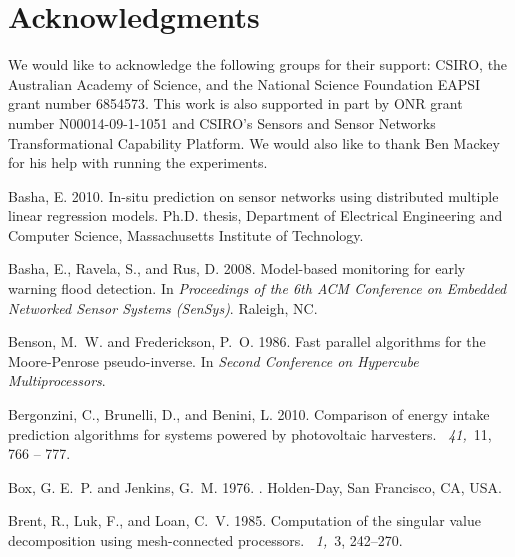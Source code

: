 \documentclass[prodmode,acmtosn]{acmsmall}
\begin{document}
\section{Acknowledgments}
We would like to acknowledge the following groups for their support: CSIRO, the Australian Academy of Science, and the National Science Foundation EAPSI grant number 6854573.
This work is also supported in part by ONR grant number N00014-09-1-1051 and CSIRO's Sensors and Sensor Networks Transformational Capability Platform.
We would also like to thank Ben Mackey for his help with running the experiments.

\begin{thebibliography}{}

{\sc Basha, E.} 2010.
\newblock In-situ prediction on sensor networks using distributed multiple
  linear regression models.
\newblock Ph.D. thesis, Department of Electrical Engineering and Computer
  Science, Massachusetts Institute of Technology.

{\sc Basha, E.}, {\sc Ravela, S.}, {\sc and} {\sc Rus, D.} 2008.
\newblock Model-based monitoring for early warning flood detection.
\newblock In {\em Proceedings of the 6th ACM Conference on Embedded Networked
  Sensor Systems (SenSys)}. Raleigh, NC.

{\sc Benson, M.~W.} {\sc and} {\sc Frederickson, P.~O.} 1986.
\newblock Fast parallel algorithms for the {Moore-Penrose} pseudo-inverse.
\newblock In {\em Second Conference on Hypercube Multiprocessors}.

{\sc Bergonzini, C.}, {\sc Brunelli, D.}, {\sc and} {\sc Benini, L.} 2010.
\newblock Comparison of energy intake prediction algorithms for systems powered
  by photovoltaic harvesters.
~{\em 41,\/}~11, 766 -- 777.

{\sc Box, G. E.~P.} {\sc and} {\sc Jenkins, G.~M.} 1976.
.
\newblock Holden-Day, San Francisco, CA, USA.

{\sc Brent, R.}, {\sc Luk, F.}, {\sc and} {\sc Loan, C.~V.} 1985.
\newblock Computation of the singular value decomposition using mesh-connected
  processors.
~{\em 1,\/}~3,
  242--270.


\end{thebibliography}
\end{document}
